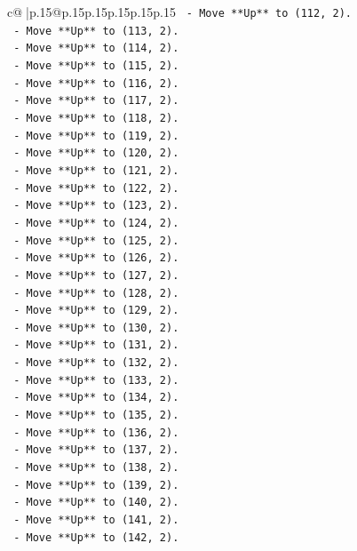 \documentclass{article}
\begin{document}
{\begin{supertabular}{c@{$\;$}|p{.15\linewidth}@{}p{.15\linewidth}p{.15\linewidth}p{.15\linewidth}p{.15\linewidth}p{.15\linewidth}}
{{{\texttt{    {-} Move **Up** to (112, 2).} \\
\texttt{    {-} Move **Up** to (113, 2).} \\
\texttt{    {-} Move **Up** to (114, 2).} \\
\texttt{    {-} Move **Up** to (115, 2).} \\
\texttt{    {-} Move **Up** to (116, 2).} \\
\texttt{    {-} Move **Up** to (117, 2).} \\
\texttt{    {-} Move **Up** to (118, 2).} \\
\texttt{    {-} Move **Up** to (119, 2).} \\
\texttt{    {-} Move **Up** to (120, 2).} \\
\texttt{    {-} Move **Up** to (121, 2).} \\
\texttt{    {-} Move **Up** to (122, 2).} \\
\texttt{    {-} Move **Up** to (123, 2).} \\
\texttt{    {-} Move **Up** to (124, 2).} \\
\texttt{    {-} Move **Up** to (125, 2).} \\
\texttt{    {-} Move **Up** to (126, 2).} \\
\texttt{    {-} Move **Up** to (127, 2).} \\
\texttt{    {-} Move **Up** to (128, 2).} \\
\texttt{    {-} Move **Up** to (129, 2).} \\
\texttt{    {-} Move **Up** to (130, 2).} \\
\texttt{    {-} Move **Up** to (131, 2).} \\
\texttt{    {-} Move **Up** to (132, 2).} \\
\texttt{    {-} Move **Up** to (133, 2).} \\
\texttt{    {-} Move **Up** to (134, 2).} \\
\texttt{    {-} Move **Up** to (135, 2).} \\
\texttt{    {-} Move **Up** to (136, 2).} \\
\texttt{    {-} Move **Up** to (137, 2).} \\
\texttt{    {-} Move **Up** to (138, 2).} \\
\texttt{    {-} Move **Up** to (139, 2).} \\
\texttt{    {-} Move **Up** to (140, 2).} \\
\texttt{    {-} Move **Up** to (141, 2).} \\
\texttt{    {-} Move **Up** to (142, 2).} \\
}}}
\end{supertabular}}
\end{document}
